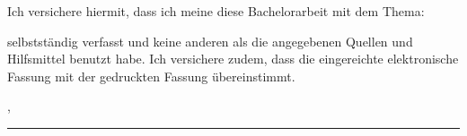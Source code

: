 \thispagestyle{empty}
\vspace*{2em}

Ich versichere hiermit, dass ich meine diese Bachelorarbeit mit dem Thema:
\begin{center}
    \vspace{2em}
    \bf\large\myTopic\rm
    \vspace{2em}
\end{center}
\noindent selbstständig verfasst und keine anderen als die angegebenen Quellen und Hilfsmittel benutzt habe. Ich versichere zudem, dass die eingereichte elektronische Fassung mit der gedruckten Fassung übereinstimmt.

\vspace{4em}

\noindent \myEndPlace, \myEndDate
\vspace{4em}

\noindent\rule{6cm}{0.4pt}\\
\myAutor